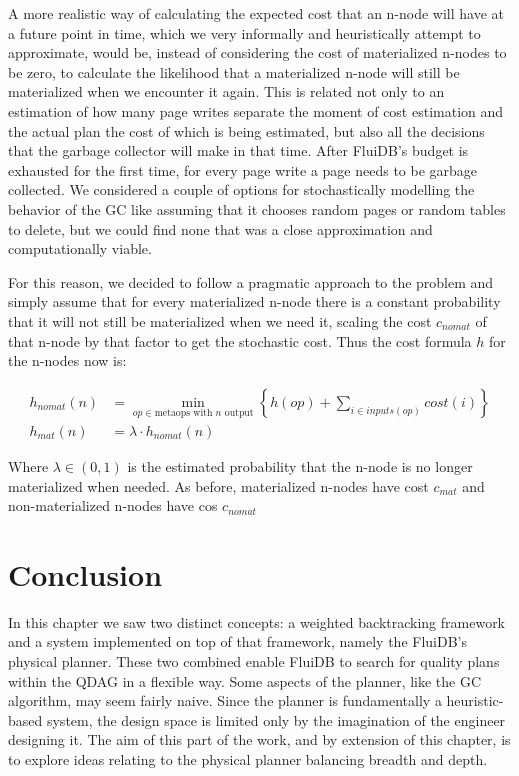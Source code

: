 A more realistic way of calculating the expected cost that an n-node will
have at a future point in time, which we very informally and
heuristically attempt to approximate, would be, instead of
considering the cost of materialized n-nodes to be zero, to calculate
the likelihood that a materialized n-node will still be materialized
when we encounter it again. This is related not only to an estimation
of how many page writes separate the moment of cost estimation and the
actual plan the cost of which is being estimated, but also all the
decisions that the garbage collector will make in that time. After
FluiDB's budget is exhausted for the first time, for every page write
a page needs to be garbage collected. We considered a couple of
options for stochastically modelling the behavior of the GC like
assuming that it chooses random pages or random tables to delete, but
we could find none that was a close approximation and
computationally viable.

For this reason, we decided to follow a pragmatic approach to the
problem and simply assume that for every materialized n-node there is a
constant probability that it will not still be materialized when we
need it, scaling the cost \(c_{nomat}\) of that n-node by that factor
to get the stochastic cost. Thus the cost formula \(h\) for the n-nodes
now is:

\begin{align*}
  h_{nomat}(n) &= \min\limits_{op \in \text{metaops with \(n\) output}} \left\{ h(op) + \sum\limits_{i \in inputs(op)} cost(i)  \right\} \\
  h_{mat}(n) &= \lambda \cdot h_{nomat}(n)
\end{align*}

Where \(\lambda \in (0,1)\) is the estimated probability that the
n-node is no longer materialized when needed. As before, materialized
n-nodes have cost \(c_{mat}\) and non-materialized n-nodes have cos
\(c_{nomat}\)

\section{Conclusion}

In this chapter we saw two distinct concepts: a weighted backtracking
framework and a system implemented on top of that framework, namely
the FluiDB's physical planner. These two combined enable FluiDB to
search for quality plans within the QDAG in a flexible way. Some
aspects of the planner, like the GC algorithm, may seem fairly
naive. Since the planner is fundamentally a heuristic-based system,
the design space is limited only by the imagination of the engineer
designing it. The aim of this part of the work, and by extension of
this chapter, is to explore ideas relating to the physical planner
balancing breadth and depth.
